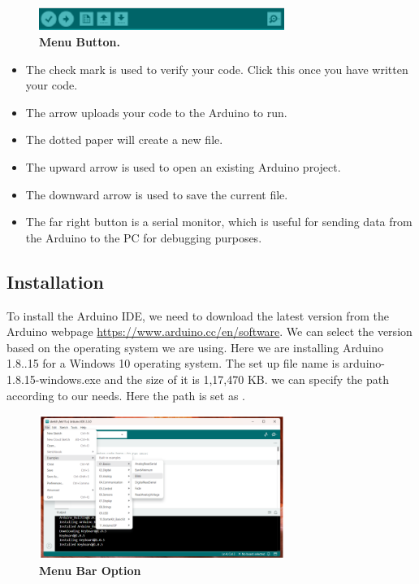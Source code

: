 \begin{figure}[H]\centering
	\includegraphics[width=8cm]{Images/software/MenuButton}
	\caption{\textbf{Menu Button.}}
	\label{fig:MenuButton}		
\end{figure}


\begin{itemize}
	\item	The check mark is used to verify your code. Click this once you have written your code.
	\item	The arrow uploads your code to the Arduino to run.
	\item	The dotted paper will create a new file.
	\item	The upward arrow is used to open an existing Arduino project.
	\item	The downward arrow is used to save the current file.
	\item	The far right button is a serial monitor, which is useful for sending data from the Arduino to the PC for debugging purposes.
\end{itemize}

\subsection{Installation}
\label{Arduinoide}
To install the Arduino IDE, we need to download the latest version from the Arduino webpage \url{https://www.arduino.cc/en/software}. We can select the version based on the operating system we are using. Here we are installing Arduino 1.8..15 for a Windows 10 operating system. 
The set up file name is arduino-1.8.15-windows.exe and the size of it is 1,17,470 KB. we can specify the path according to our needs. Here the path is set as  .

\begin{figure}[H]\centering
	\includegraphics[width=8cm]{Images/software/MenuBarOption}
	\caption{\textbf{Menu Bar Option}}
	\label{fig:MenuBarOption}		
\end{figure}

